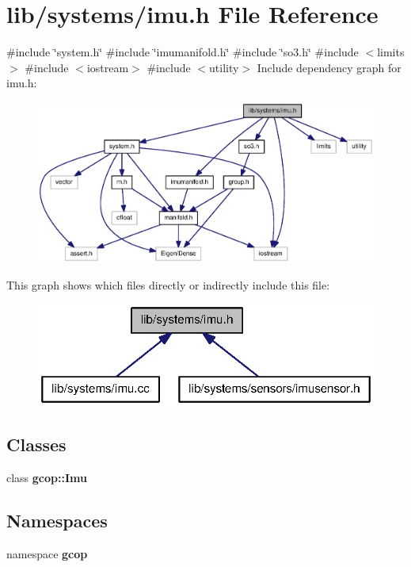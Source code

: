 \section{lib/systems/imu.h \-File \-Reference}
\label{imu_8h}
{\ttfamily \#include \char`\"{}system.\-h\char`\"{}}\*
{\ttfamily \#include \char`\"{}imumanifold.\-h\char`\"{}}\*
{\ttfamily \#include \char`\"{}so3.\-h\char`\"{}}\*
{\ttfamily \#include $<$limits$>$}\*
{\ttfamily \#include $<$iostream$>$}\*
{\ttfamily \#include $<$utility$>$}\*
\-Include dependency graph for imu.\-h\-:\nopagebreak
\begin{figure}[H]
\begin{center}
\leavevmode
\includegraphics[width=350pt]{imu_8h__incl}
\end{center}
\end{figure}
\-This graph shows which files directly or indirectly include this file\-:\nopagebreak
\begin{figure}[H]
\begin{center}
\leavevmode
\includegraphics[width=320pt]{imu_8h__dep__incl}
\end{center}
\end{figure}
\subsection*{\-Classes}
\begin{DoxyCompactItemize}
\item 
class {\bf gcop\-::\-Imu}
\end{DoxyCompactItemize}
\subsection*{\-Namespaces}
\begin{DoxyCompactItemize}
\item 
namespace {\bf gcop}
\end{DoxyCompactItemize}
